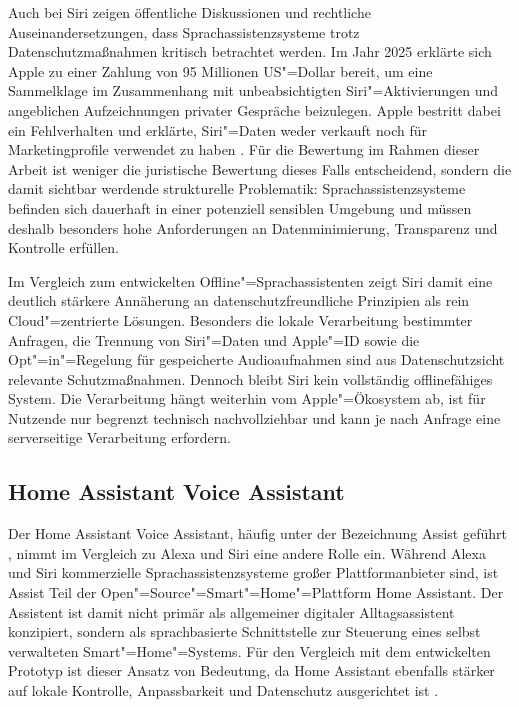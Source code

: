 Auch bei Siri zeigen öffentliche Diskussionen und rechtliche Auseinandersetzungen, dass Sprachassistenzsysteme trotz Datenschutzmaßnahmen kritisch betrachtet werden. Im Jahr 2025 erklärte sich Apple zu einer Zahlung von 95 Millionen US"=Dollar bereit, um eine Sammelklage im Zusammenhang mit unbeabsichtigten Siri"=Aktivierungen und angeblichen Aufzeichnungen privater Gespräche beizulegen. Apple bestritt dabei ein Fehlverhalten und erklärte, Siri"=Daten weder verkauft noch für Marketingprofile verwendet zu haben \autocite{LopezSiriCase, AppleLawsuitBBC}. Für die Bewertung im Rahmen dieser Arbeit ist weniger die juristische Bewertung dieses Falls entscheidend, sondern die damit sichtbar werdende strukturelle Problematik: Sprachassistenzsysteme befinden sich dauerhaft in einer potenziell sensiblen Umgebung und müssen deshalb besonders hohe Anforderungen an Datenminimierung, Transparenz und Kontrolle erfüllen.

Im Vergleich zum entwickelten Offline"=Sprachassistenten zeigt Siri damit eine deutlich stärkere Annäherung an datenschutzfreundliche Prinzipien als rein Cloud"=zentrierte Lösungen. Besonders die lokale Verarbeitung bestimmter Anfragen, die Trennung von Siri"=Daten und Apple"=ID sowie die Opt"=in"=Regelung für gespeicherte Audioaufnahmen sind aus Datenschutzsicht relevante Schutzmaßnahmen. Dennoch bleibt Siri kein vollständig offlinefähiges System. Die Verarbeitung hängt weiterhin vom Apple"=Ökosystem ab, ist für Nutzende nur begrenzt technisch nachvollziehbar und kann je nach Anfrage eine serverseitige Verarbeitung erfordern.


\subsection{Home Assistant Voice Assistant}
\label{subsec:home-assistant-voice-assistant}
Der Home Assistant Voice Assistant, häufig unter der Bezeichnung Assist geführt \autocite{Assist-Documentation}, nimmt im Vergleich zu Alexa und Siri eine andere Rolle ein. Während Alexa und Siri kommerzielle Sprachassistenzsysteme großer Plattformanbieter sind, ist Assist Teil der Open"=Source"=Smart"=Home"=Plattform Home Assistant. Der Assistent ist damit nicht primär als allgemeiner digitaler Alltagsassistent konzipiert, sondern als sprachbasierte Schnittstelle zur Steuerung eines selbst verwalteten Smart"=Home"=Systems. Für den Vergleich mit dem entwickelten Prototyp ist dieser Ansatz von Bedeutung, da Home Assistant ebenfalls stärker auf lokale Kontrolle, Anpassbarkeit und Datenschutz ausgerichtet ist \autocite{Assist-Documentation}.

